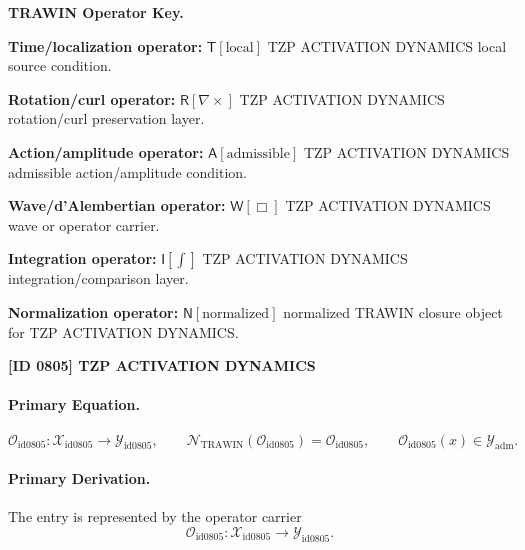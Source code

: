 \par\vspace{0.45\baselineskip}
\noindent\begin{minipage}[t]{\linewidth}
\begingroup
\small
\raggedright
\textbf{TRAWIN Operator Key.}\par
\noindent\textbf{Time/localization operator:} $\mathsf{T}\!\left[\mathrm{local}\right]$ TZP ACTIVATION DYNAMICS local source condition.\par
\noindent\textbf{Rotation/curl operator:} $\mathsf{R}\!\left[\nabla\times\right]$ TZP ACTIVATION DYNAMICS rotation/curl preservation layer.\par
\noindent\textbf{Action/amplitude operator:} $\mathsf{A}\!\left[\mathrm{admissible}\right]$ TZP ACTIVATION DYNAMICS admissible action/amplitude condition.\par
\noindent\textbf{Wave/d'Alembertian operator:} $\mathsf{W}\!\left[\Box\right]$ TZP ACTIVATION DYNAMICS wave or operator carrier.\par
\noindent\textbf{Integration operator:} $\mathsf{I}\!\left[\int\right]$ TZP ACTIVATION DYNAMICS integration/comparison layer.\par
\noindent\textbf{Normalization operator:} $\mathsf{N}\!\left[\mathrm{normalized}\right]$ normalized TRAWIN closure object for TZP ACTIVATION DYNAMICS.\par
\endgroup
\end{minipage}

\clearpage
\noindent\textbf{[ID 0805] TZP ACTIVATION DYNAMICS}\par
\vspace{0.35em}
\paragraph{Primary Equation.}
\[
\mathcal{O}_{\mathrm{id0805}}:\mathcal{X}_{\mathrm{id0805}}\longrightarrow \mathcal{Y}_{\mathrm{id0805}},\qquad
\mathcal{N}_{\mathrm{TRAWIN}}(\mathcal{O}_{\mathrm{id0805}})=\mathcal{O}_{\mathrm{id0805}},\qquad
\mathcal{O}_{\mathrm{id0805}}(x)\in\mathcal{Y}_{\mathrm{adm}}.
\]

\paragraph{Primary Derivation.} The entry is represented by the operator carrier\[
\mathcal{O}_{\mathrm{id0805}}:\mathcal{X}_{\mathrm{id0805}}\longrightarrow \mathcal{Y}_{\mathrm{id0805}}.
\]

